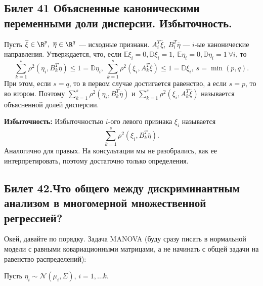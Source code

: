 \subsection{Билет 41 Объясненные	каноническими	переменными	доли	дисперсии.	Избыточность.}
Пусть $\overline{\xi} \in \R^p, \ \overline{\eta} \in \R^q$ --- исходные признаки.
$A_i^T \overline{\xi}, \ B_i^T \overline{\eta}$ --- $i$-ые канонические направления.
Утверждается, что, если $\mathbb{E}\xi_i = 0, \mathbb{D}\xi_i = 1, \ \mathbb{E}\eta_i = 0, \mathbb{D}\eta_i = 1 \ \forall i$, то
\begin{equation*}
\sum\limits_{k = 1}^{s} \rho^2(\eta_i, B_k^T \overline{\eta}) \le 1 = \mathbb{D}\eta_i, \ \sum\limits_{k = 1}^{s} \rho^2(\xi_i, A_k^T \overline{\xi}) \le 1 = \mathbb{D} \xi_i , \ s = \min(p, q).
\end{equation*}
При этом, если $s = q$, то в первом случае достигается равенство, а если $s = p$, то во втором.
Поэтому $\sum\limits_{k = 1}^{s} \rho^2(\eta_i, B_k^T \overline{\eta})$ и $\sum\limits_{k = 1}^{s} \rho^2(\xi_i, A_k^T \overline{\xi})$ называется объясненной долей дисперсии.

\textbf{Избыточность:}
Избыточностью $i$-ого левого признака $\xi_i$ называется 
\begin{equation*}
\sum\limits_{k = 1}^{s} \rho^2(\xi_i, B_k^T \overline{\eta}).
\end{equation*}
Аналогично для правых. На консультации мы не разобрались, как ее интерпретировать, поэтому достаточно только определения.

\subsection{Билет 42.Что общего	между	дискриминантным	анализом в многомерной	множественной	регрессией?}  
Окей, давайте по порядку.
Задача MANOVA (буду сразу писать в нормальной модели с равными ковариационными матрицами, а не начинать с общей задачи на равенство распределений):

Пусть $\eta_i \sim \mathcal{N}(\mu_i, \Sigma)$, $i = 1, \ldots k$.

